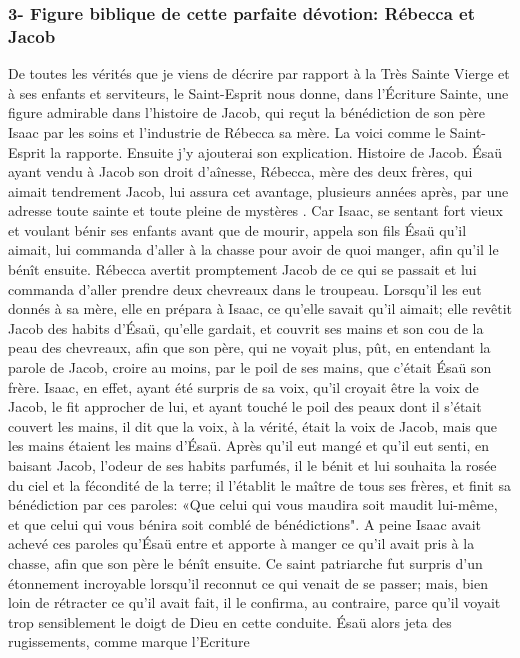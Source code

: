 \subsubsection{3- Figure biblique de cette parfaite dévotion: Rébecca et Jacob}
 De toutes les vérités que je viens de décrire par rapport à la Très Sainte Vierge et à ses enfants et serviteurs,
le Saint-Esprit nous donne, dans l'Écriture Sainte, une figure admirable dans l'histoire de Jacob, qui reçut la
bénédiction de son père Isaac par les soins et l'industrie de Rébecca sa mère. La voici comme le Saint-Esprit la
rapporte. Ensuite j'y ajouterai son explication.
Histoire de Jacob.
 Ésaü ayant vendu à Jacob son droit d'aînesse, Rébecca, mère des deux frères, qui aimait tendrement Jacob,
lui assura cet avantage, plusieurs années après, par une adresse toute sainte et toute pleine de mystères . Car
Isaac, se sentant fort vieux et voulant bénir ses enfants avant que de mourir, appela son fils Ésaü qu'il aimait, lui
commanda d'aller à la chasse pour avoir de quoi manger, afin qu'il le bénît ensuite. Rébecca avertit promptement
Jacob de ce qui se passait et lui commanda d'aller prendre deux chevreaux dans le troupeau. Lorsqu'il les eut
donnés à sa mère, elle en prépara à Isaac, ce qu'elle savait qu'il aimait; elle revêtit Jacob des habits d'Ésaü,
qu'elle gardait, et couvrit ses mains et son cou de la peau des chevreaux, afin que son père, qui ne voyait plus,
pût, en entendant la parole de Jacob, croire au moins, par le poil de ses mains, que c'était Ésaü son frère. Isaac,
en effet, ayant été surpris de sa voix, qu'il croyait être la voix de Jacob, le fit approcher de lui, et ayant touché le
poil des peaux dont il s'était couvert les mains, il dit que la voix, à la vérité, était la voix de Jacob, mais que les
mains étaient les mains d'Ésaü. Après qu'il eut mangé et qu'il eut senti, en baisant Jacob, l'odeur de ses habits
parfumés, il le bénit et lui souhaita la rosée du ciel et la fécondité de la terre; il l'établit le maître de tous ses frères,
et finit sa bénédiction par ces paroles: «Que celui qui vous maudira soit maudit lui-même, et que celui qui vous
bénira soit comblé de bénédictions".
A peine Isaac avait achevé ces paroles qu'Ésaü entre et apporte à manger ce qu'il avait pris à la chasse, afin que
son père le bénît ensuite. Ce saint patriarche fut surpris d'un étonnement incroyable lorsqu'il reconnut ce qui venait
de se passer; mais, bien loin de rétracter ce qu'il avait fait, il le confirma, au contraire, parce qu'il voyait trop
sensiblement le doigt de Dieu en cette conduite. Ésaü alors jeta des rugissements, comme marque l'Ecriture
